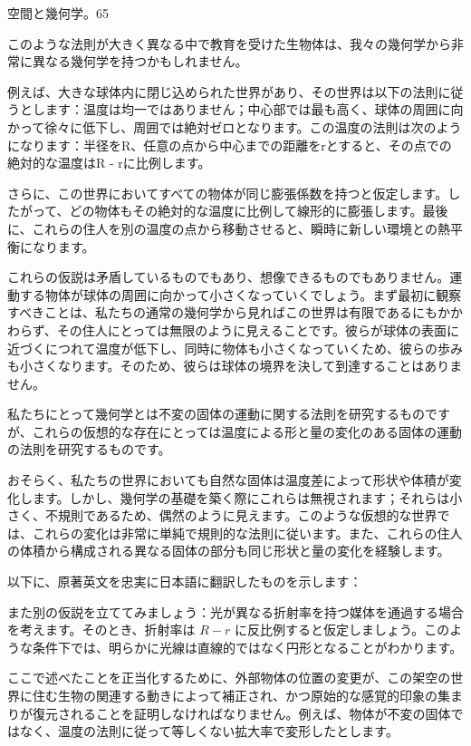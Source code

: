 \documentclass[a4paper,11pt,openany]{ltjsbook}
\begin{document}
空間と幾何学。65

このような法則が大きく異なる中で教育を受けた生物体は、我々の幾何学から非常に異なる幾何学を持つかもしれません。

例えば、大きな球体内に閉じ込められた世界があり、その世界は以下の法則に従うとします：温度は均一ではありません；中心部では最も高く、球体の周囲に向かって徐々に低下し、周囲では絶対ゼロとなります。この温度の法則は次のようになります：半径をR、任意の点から中心までの距離をrとすると、その点での絶対的な温度はR - rに比例します。

さらに、この世界においてすべての物体が同じ膨張係数を持つと仮定します。したがって、どの物体もその絶対的な温度に比例して線形的に膨張します。最後に、これらの住人を別の温度の点から移動させると、瞬時に新しい環境との熱平衡になります。

これらの仮説は矛盾しているものでもあり、想像できるものでもありません。運動する物体が球体の周囲に向かって小さくなっていくでしょう。まず最初に観察すべきことは、私たちの通常の幾何学から見ればこの世界は有限であるにもかかわらず、その住人にとっては無限のように見えることです。彼らが球体の表面に近づくにつれて温度が低下し、同時に物体も小さくなっていくため、彼らの歩みも小さくなります。そのため、彼らは球体の境界を決して到達することはありません。

私たちにとって幾何学とは不変の固体の運動に関する法則を研究するものですが、これらの仮想的な存在にとっては温度による形と量の変化のある固体の運動の法則を研究するものです。

おそらく、私たちの世界においても自然な固体は温度差によって形状や体積が変化します。しかし、幾何学の基礎を築く際にこれらは無視されます；それらは小さく、不規則であるため、偶然のように見えます。このような仮想的な世界では、これらの変化は非常に単純で規則的な法則に従います。また、これらの住人の体積から構成される異なる固体の部分も同じ形状と量の変化を経験します。

以下に、原著英文を忠実に日本語に翻訳したものを示します：

また別の仮説を立ててみましょう：光が異なる折射率を持つ媒体を通過する場合を考えます。そのとき、折射率は \( R - r \) に反比例すると仮定しましょう。このような条件下では、明らかに光線は直線的ではなく円形となることがわかります。

ここで述べたことを正当化するために、外部物体の位置の変更が、この架空の世界に住む生物の関連する動きによって補正され、かつ原始的な感覚的印象の集まりが復元されることを証明しなければなりません。例えば、物体が不変の固体ではなく、温度の法則に従って等しくない拡大率で変形したとします。
\end{document}
